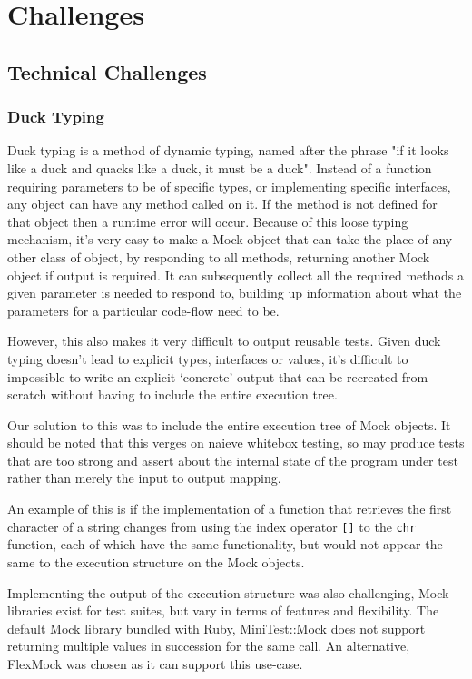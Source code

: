 \chapter{Challenges}
\section{Technical Challenges}
  \subsection{Duck Typing}
    Duck typing is a method of dynamic typing, named after the phrase "if it looks like a duck and quacks like a duck, it must be a duck".
    Instead of a function requiring parameters to be of specific types, or implementing specific interfaces, any object can have any method called on it.
    If the method is not defined for that object then a runtime error will occur.
    Because of this loose typing mechanism, it's very easy to make a Mock object that can take the place of any other class of object, by responding to all methods, returning another Mock object if output is required.
    It can subsequently collect all the required methods a given parameter is
needed to respond to, building up information about what the parameters for a particular code-flow need to be.

    However, this also makes it very difficult to output reusable tests.
    Given duck typing doesn't lead to explicit types, interfaces or values, it's difficult to impossible to write an explicit `concrete' output that can be recreated from scratch without having to include the entire execution tree.

    Our solution to this was to include the entire execution tree of Mock
objects. It should be noted that this verges on naieve whitebox testing, so may
produce tests that are too strong and assert about the internal state of the
program under test rather than merely the input to output mapping.

An example of this is if the implementation of a function that retrieves the
first character of a string changes from using the index operator \texttt{[]} to
the \texttt{chr}
function, each of which have the same functionality, but would not appear the same
to the execution structure on the Mock objects.

    Implementing the output of the execution structure was also challenging,
Mock libraries exist for test suites, but vary in terms of features and
flexibility. The default Mock library bundled with Ruby, MiniTest::Mock does not
support returning multiple values in succession for the same call. An
alternative, FlexMock was chosen as it can support this use-case.

